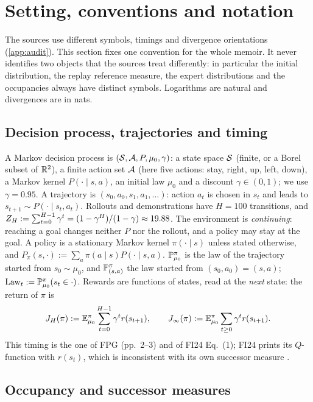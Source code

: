 \section{Setting, conventions and notation}\label{sec:notation}\label{sec:setting}

The sources use different symbols, timings and divergence orientations (\cref{app:audit}).
This section fixes one convention for the whole memoir.
It never identifies two objects that the sources treat differently: in particular the initial distribution, the replay reference measure, the expert distributions and the occupancies always have distinct symbols.
Logarithms are natural and divergences are in nats.

\subsection{Decision process, trajectories and timing}

A Markov decision process is $(\cS,\cA,P,\mu_0,\gamma)$: a state space $\cS$ (finite, or a Borel subset of $\R^2$), a finite action set $\cA$ (here five actions: stay, right, up, left, down), a Markov kernel $P(\cdot\mid s,a)$, an initial law $\mu_0$ and a discount $\gamma\in(0,1)$; we use $\gamma=0.95$.
A trajectory is $(s_0,a_0,s_1,a_1,\dots)$: action $a_t$ is chosen in $s_t$ and leads to $s_{t+1}\sim P(\cdot\mid s_t,a_t)$.
Rollouts and demonstrations have $H=100$ transitions, and $Z_H:=\sum_{t=0}^{H-1}\gamma^t=(1-\gamma^H)/(1-\gamma)\approx\vn{const.ZH}{19.88}$.
The environment is \emph{continuing}: reaching a goal changes neither $P$ nor the rollout, and a policy may stay at the goal.
A policy is a stationary Markov kernel $\pi(\cdot\mid s)$ unless stated otherwise, and $P_\pi(s,\cdot):=\sum_a\pi(a\mid s)P(\cdot\mid s,a)$.
$\Prob^\pi_{\mu_0}$ is the law of the trajectory started from $s_0\sim\mu_0$, and $\Prob^\pi_{(s,a)}$ the law started from $(s_0,a_0)=(s,a)$; $\law_t:=\Prob^\pi_{\mu_0}(s_t\in\cdot)$.
Rewards are functions of states, read at the \emph{next} state: the return of $\pi$ is
\begin{equation}\label{eq:m-return}
J_H(\pi):=\E^\pi_{\mu_0}\sum_{t=0}^{H-1}\gamma^tr(s_{t+1}),\qquad J_\infty(\pi):=\E^\pi_{\mu_0}\sum_{t\ge0}\gamma^tr(s_{t+1}).
\end{equation}
This timing is the one of FPG (pp.~2--3) and of FI24 Eq.~(1); FI24 prints its $Q$-function with $r(s_t)$, which is inconsistent with its own successor measure .

\subsection{Occupancy and successor measures}

